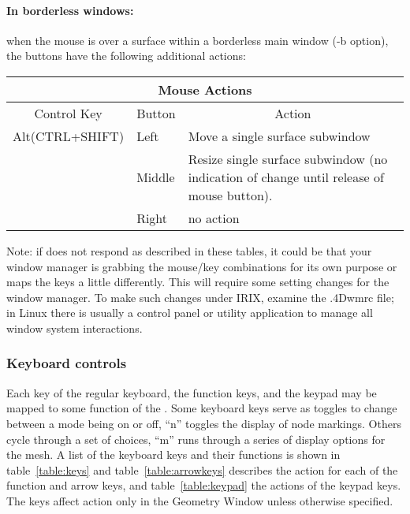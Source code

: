 \paragraph{In borderless windows: } when the mouse is over a 
surface within a borderless main window (-b option), the buttons have the
following additional actions: 
\begin{center}
  \begin{tabular}{|l|l|p{3in}|} \hline
    \multicolumn{3}{|c|}{Mouse Actions}\\ \hline
    \multicolumn{1}{|c|}{Control Key} & 
    \multicolumn{1}{|c|}{Button} & 
    \multicolumn{1}{|c|}{Action}\\ \hline
    Alt(CTRL+SHIFT)   & Left & Move a single surface subwindow \\ 
      & Middle & Resize single surface subwindow (no indication of change
    until release of mouse button).\\ 
      & Right & no action \\ \hline
  \end{tabular}
\end{center}

Note: if \map{}  does not respond as described in these tables, it could be
that your window manager is grabbing the mouse/key combinations for its own
purpose or maps the keys a little differently.  This will require some setting changes for the window manager.
To make such changes under IRIX, examine the .4Dwmrc file; in Linux there
is usually a control panel or utility application to manage all window
system interactions.


\subsubsection{Keyboard controls}
\label{sec:control-keys} 

Each key of the regular keyboard, the function keys, and the keypad may be
mapped to some function of the \map{}.  Some keyboard keys serve as toggles
to change between a mode being on or off, \eg{} ``n'' toggles the display
of node markings.  Others cycle through a set of choices, \eg{} ``m'' runs
through a series of display options for the mesh.  A list of the keyboard
keys and their functions is shown in table~\ref{table:keys} and
table~\ref{table:arrowkeys} describes the action for each of the function
and arrow keys, and table~\ref{table:keypad} the actions of the keypad
keys.  The keys affect action only in the Geometry Window unless otherwise
specified.

